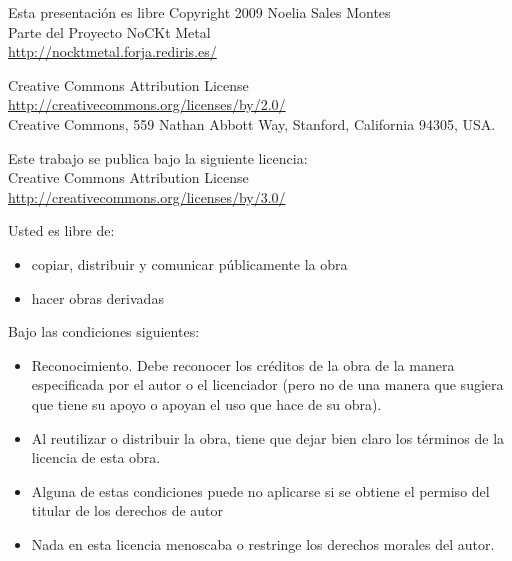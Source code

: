 
\scriptsize

 \begin{frame}{Esta presentación es libre}
  Copyright 2009 Noelia Sales Montes\\
  Parte del Proyecto NoCKt Metal\\
  \url{http://nocktmetal.forja.rediris.es/}
  
  \vspace*{0.3cm}
  
  Creative Commons Attribution License
  \url{http://creativecommons.org/licenses/by/2.0/}\\
  Creative Commons, 559 Nathan Abbott Way, Stanford, California 94305,
  USA.
  
  \vspace*{0.3cm}
  
  Este trabajo se publica bajo la siguiente licencia:\\
  Creative Commons Attribution License
  \url{http://creativecommons.org/licenses/by/3.0/}
  
  \vspace*{0.3cm}
  
  Usted es libre de:
  \begin{itemize}
   \item copiar, distribuir y comunicar públicamente la obra
   \item hacer obras derivadas
  \end{itemize}
  
  Bajo las condiciones siguientes:
  \begin{itemize}
   \item Reconocimiento. Debe reconocer los créditos de la obra de la
	 manera especificada por el autor o el licenciador (pero no de una
	 manera que sugiera que tiene su apoyo o apoyan el uso que hace de
	 su obra).
   \item Al reutilizar o distribuir la obra, tiene que dejar bien claro los
	 términos de la licencia de esta obra.
   \item Alguna de estas condiciones puede no aplicarse si se obtiene el
	 permiso del titular de los derechos de autor
   \item Nada en esta licencia menoscaba o restringe los derechos morales
	 del autor.
  \end{itemize}
 \end{frame}
